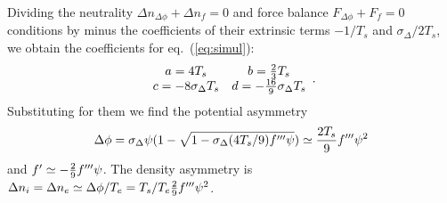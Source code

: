 \documentclass[pre]{revtex4-2}
\begin{document}
Dividing the neutrality $\Delta n_{\Delta\phi}+ \Delta n_f=0$ and
force balance $F_{\Delta\phi}+F_f=0$ conditions by minus the
coefficients of their extrinsic terms $-1/T_s$ and
$\sigma_\Delta/2T_s$, we obtain the coefficients for eq.\
(\ref{eq:simul}):
\begin{equation}
  \label{eq:coefs}
  \begin{array}{cc}
    a=4T_s&b={2\over 3}T_s\\
    c=-8\sigma_\Delta T_s& d=-{16\over 9}\sigma_\Delta T_s
  \end{array}.
\end{equation}
Substituting for them we find the potential asymmetry
\begin{equation}
  \label{eq:subst}
  \Delta\phi=\sigma_\Delta\psi(1 -\sqrt{1 -\sigma_\Delta (4T_s/9)f'''\psi})
  \simeq {2T_s\over9}f''' \psi^2
\end{equation}
and $f'\simeq -{2\over 9}f'''\psi$. The density asymmetry is $\Delta
n_i=\Delta n_e\simeq \Delta\phi/T_e = T_s/T_e {2\over 9}f'''\psi^2$.
\end{document}
